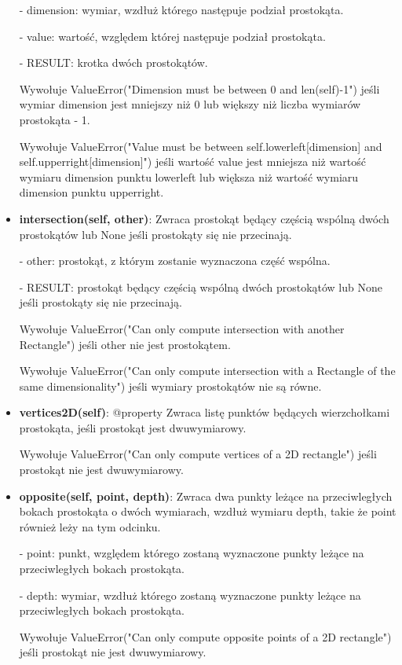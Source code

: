 \documentclass{lab}
\begin{document}
\begin{itemize}
  - dimension: wymiar, wzdłuż którego następuje podział prostokąta.

  - value: wartość, względem której następuje podział prostokąta.

  - RESULT: krotka dwóch prostokątów.

  Wywołuje ValueError("Dimension must be between 0 and {len(self)-1}") jeśli wymiar dimension jest mniejszy niż 0 lub większy niż liczba wymiarów prostokąta - 1.

  Wywołuje ValueError("Value must be between {self.lowerleft[dimension]} and {self.upperright[dimension]}") jeśli wartość value jest mniejsza niż wartość wymiaru dimension punktu lowerleft lub większa niż wartość wymiaru dimension punktu upperright.

  \item \textbf{intersection(self, other)}:
  Zwraca prostokąt będący częścią wspólną dwóch prostokątów lub None jeśli prostokąty się nie przecinają.

  - other: prostokąt, z którym zostanie wyznaczona część wspólna.

  - RESULT: prostokąt będący częścią wspólną dwóch prostokątów lub None jeśli prostokąty się nie przecinają.

  Wywołuje ValueError("Can only compute intersection with another Rectangle") jeśli other nie jest prostokątem.

  Wywołuje ValueError("Can only compute intersection with a Rectangle of the same dimensionality") jeśli wymiary prostokątów nie są równe.

  \item \textbf{vertices2D(self)}:
  @property Zwraca listę punktów będących wierzchołkami prostokąta, jeśli prostokąt jest dwuwymiarowy.

  Wywołuje ValueError("Can only compute vertices of a 2D rectangle") jeśli prostokąt nie jest dwuwymiarowy.

  \item \textbf{opposite(self, point, depth)}:
  Zwraca dwa punkty leżące na przeciwległych bokach prostokąta o dwóch wymiarach, wzdłuż wymiaru depth, takie że point również leży na tym odcinku.

  - point: punkt, względem którego zostaną wyznaczone punkty leżące na przeciwległych bokach prostokąta.

  - depth: wymiar, wzdłuż którego zostaną wyznaczone punkty leżące na przeciwległych bokach prostokąta.

  Wywołuje ValueError("Can only compute opposite points of a 2D rectangle") jeśli prostokąt nie jest dwuwymiarowy. 
\end{itemize}
\end{document}
